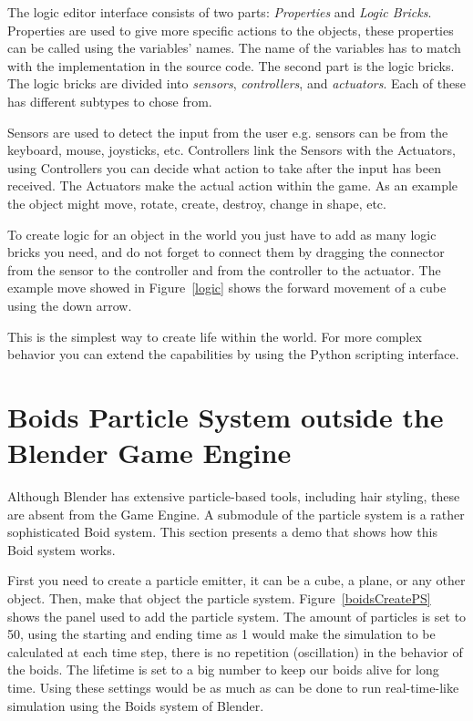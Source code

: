 The logic editor interface consists of two parts: \textit{Properties} and \textit{Logic Bricks}. Properties are used to give more specific actions to the objects, these properties can be called using the variables' names. The name of the variables has to match with the implementation in the source code. The second part is the logic bricks. The logic bricks are divided into \textit{sensors}, \textit{controllers}, and \textit{actuators}. Each of these has different subtypes to chose from.

Sensors are used to detect the input from the user e.g. sensors can be from the keyboard, mouse, joysticks, etc. Controllers link the Sensors with the Actuators, using Controllers you can decide what action to take after the input has been received. The Actuators make the actual action within the game. As an example the object might move, rotate, create, destroy, change in shape, etc.

To create logic for an object in the world you just have to add as many logic bricks you need, and do not forget to connect them by dragging the connector from the sensor to the controller and from the controller to the actuator. The example move showed in Figure~\ref{logic} shows the forward movement of a cube using the down arrow.

This is the simplest way to create life within the world. For more complex behavior you can extend the capabilities by using the Python scripting interface.

\section{Boids Particle System outside the Blender Game Engine}
Although Blender has extensive particle-based tools, including hair styling, these are absent from the Game Engine. A submodule of the particle system is a rather sophisticated Boid system. This section presents a demo that shows how this Boid system works.

First you need to create a particle emitter, it can be a cube, a plane, or any other object. Then, make that object the particle system. Figure~\ref{boidsCreatePS} shows the panel used to add the particle system. The amount of particles is set to 50, using the starting and ending time as 1 would make the simulation to be calculated at each time step, there is no repetition (oscillation) in the behavior of the boids. The lifetime is set to a big number to keep our boids alive for long time. Using these settings would be as much as can be done to run real-time-like simulation using the Boids system of Blender.

